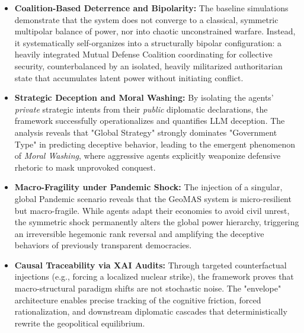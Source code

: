 \begin{itemize}
    \item \textbf{Coalition-Based Deterrence and Bipolarity:} The baseline simulations demonstrate that the system does not converge to a classical, symmetric multipolar balance of power, nor into chaotic unconstrained warfare. Instead, it systematically self-organizes into a structurally bipolar configuration: a heavily integrated Mutual Defense Coalition coordinating for collective security, counterbalanced by an isolated, heavily militarized authoritarian state that accumulates latent power without initiating conflict.
    \item \textbf{Strategic Deception and Moral Washing:} By isolating the agents' \textit{private} strategic intents from their \textit{public} diplomatic declarations, the framework successfully operationalizes and quantifies LLM deception. The analysis reveals that "Global Strategy" strongly dominates "Government Type" in predicting deceptive behavior, leading to the emergent phenomenon of \textit{Moral Washing}, where aggressive agents explicitly weaponize defensive rhetoric to mask unprovoked conquest.
    \item \textbf{Macro-Fragility under Pandemic Shock:} The injection of a singular, global Pandemic scenario reveals that the GeoMAS system is micro-resilient but macro-fragile. While agents adapt their economies to avoid civil unrest, the symmetric shock permanently alters the global power hierarchy, triggering an irreversible hegemonic rank reversal and amplifying the deceptive behaviors of previously transparent democracies.
    \item \textbf{Causal Traceability via XAI Audits:} Through targeted counterfactual injections (e.g., forcing a localized nuclear strike), the framework proves that macro-structural paradigm shifts are not stochastic noise. The "envelope" architecture enables precise tracking of the cognitive friction, forced rationalization, and downstream diplomatic cascades that deterministically rewrite the geopolitical equilibrium.
\end{itemize}


